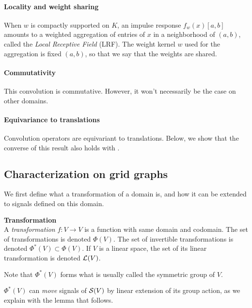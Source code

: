 \paragraph{Locality and weight sharing}
When $w$ is compactly supported on $K$, an impulse response $f_w(x)[a,b]$ amounts to a weighted aggregation of entries of $x$ in a neighborhood of $(a,b)$, called the \emph{Local Receptive Field} (LRF). The weight kernel $w$ used for the aggregation is fixed \wrt $(a,b)$, so that we say that the weights are shared.

\paragraph{Commutativity}
This convolution is commutative. However, it won't necessarily be the case on other domains.

\paragraph{Equivariance to translations}
Convolution operators are equivariant to translations. Below, we show that the converse of this result also holds with .

\subsection{Characterization on grid graphs}

We first define what a transformation of a domain is, and how it can be extended to signals defined on this domain.

\begin{definition}\textbf{Transformation}\\
A \emph{transformation} $f: V \rightarrow V$ is a function with same domain and codomain. The set of transformations is denoted $\Phi(V)$. The set of invertible transformations is denoted $\Phi^*(V) \subset \Phi(V)$. If $V$ is a linear space, the set of its linear transformation is denoted $\mathcal{L}(V)$.
\end{definition}

\begin{remark}
Note that $\Phi^*(V)$ forms what is usually called the symmetric group of $V$.
\end{remark}

$\Phi^*(V)$ can \emph{move} signals of $\mathcal{S}(V)$ by linear extension of its group action, as we explain with the lemma that follows.

